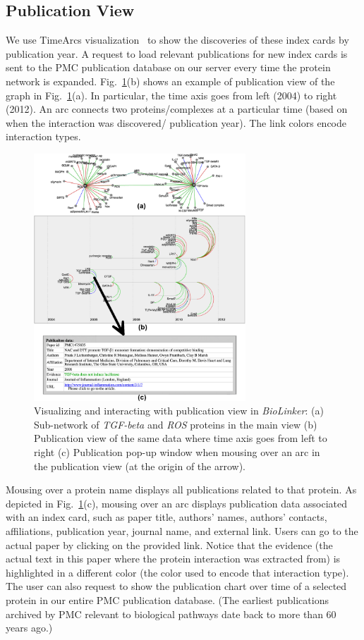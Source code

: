 \documentclass[journal]{vgtc}                %
\newcommand{\theName}{\textit{BioLinker}}
\begin{document}
\subsection{Publication View}
\label{sec:PublicationView}
We use TimeArcs visualization~\cite{Dang2016TimeArcs} to show the discoveries of these index cards by publication year. A request to load relevant publications for new index cards is sent to the PMC publication database on our server every time the protein network is expanded.
Fig.~\ref{fig:Figure6}(b) shows an example of publication view of the graph in Fig.~\ref{fig:Figure6}(a). In particular, the time axis goes from left (2004) to right (2012). An arc connects two proteins/complexes at a particular time (based on when the interaction was discovered/ publication year). The link colors encode interaction types. 

\begin{figure}[h!]
  \centering
  \includegraphics[width=225pt]{figures/Figure6.png}
  \caption{ Visualizing and interacting with publication view in \theName{}: (a) Sub-network of \textit{TGF-beta} and \textit{ROS} proteins in the main view (b) Publication view of the same data where time axis goes from left to right (c) Publication pop-up window when mousing over an arc in the publication view (at the origin of the arrow).
  }
  \label{fig:Figure6}
\end{figure}

Mousing over a protein name displays all publications related to that protein. As depicted in Fig.~\ref{fig:Figure6}(c), mousing over an arc displays publication data associated with an index card, such as paper title, authors' names, authors' contacts, affiliations, publication year, journal name, and external link. Users can go to the actual paper by clicking on the provided link. Notice that the evidence (the actual text in this paper where the protein interaction was extracted from) is highlighted in a different color (the color used to encode that interaction type). The user can also request to show the publication chart over time of a selected protein in our entire PMC publication database. (The earliest publications archived by PMC relevant to biological pathways date back to more than 60 years ago.)
\end{document}
